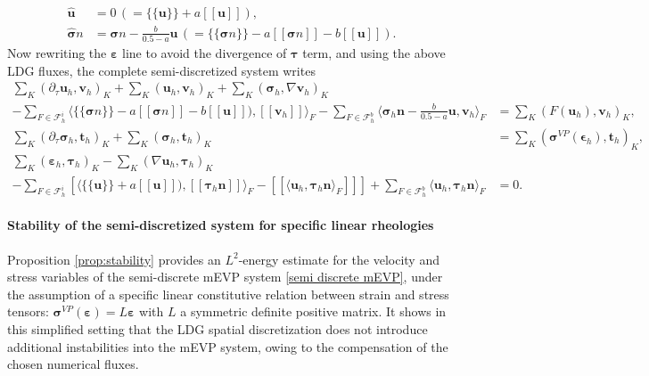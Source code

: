\documentclass[11pt]{article}
\newcommand{\bu}{\mathbf{u}}
\newcommand{\bt}{\mathbf{t}}
\newcommand{\sig}{\boldsymbol{\sigma}}
\newcommand{\btau}{\boldsymbol{\tau}}
\newcommand{\beps}{\boldsymbol{\varepsilon}}
\newcommand{\ljp}{ [\![ }
\newcommand{\rjp}{ ]\!] }
\begin{document}
\begin{align}
\widehat{\mathbf{u}} &= 0 \, (= \{\!\{\bu \}\!\} + a \ljp \bu\rjp), \\
\widehat{\sig} n
&= \sig n - \frac{b}{0.5-a} \bu \, (= 
\{\!\{\sig n\}\!\} - a \ljp \sig n \rjp
- b [\![\bu]\!]).
\end{align}
Now rewriting the $\beps$ line to avoid the divergence of $\btau$ term, and using the above LDG fluxes, the complete semi-discretized system writes
\begingroup
\small
\begin{subequations}
    \label{semi discrete mEVP}
\begin{align}
 \sum_{K} ( \partial_\tau \mathbf{u}_h, \mathbf{v}_h)_K+ \sum_{K} (\mathbf{u}_h, \mathbf{v}_h)_K
+ \sum_{K} (\boldsymbol{\sigma}_h, \nabla \mathbf{v}_h)_K\qquad &\nonumber \\
%
-\sum_{F \in \mathcal{F}_h^i} \langle \{\!\{\sig n\}\!\} - a \ljp \sig n \rjp
- b [\![\bu]\!]), \ljp \mathbf{v}_h  \rjp\rangle_{F} 
%
-\sum_{F \in \mathcal{F}_h^b} \langle \boldsymbol{\sigma}_h \mathbf{n} - \frac{b}{0.5-a} \bu , \mathbf{v}_h \rangle_{F}
&= \sum_{K} (F(\bu_h), \mathbf{v}_h)_K,
\label{u line sd}\\
%
 \sum_K (\partial_\tau \boldsymbol{\sigma}_h, \bt_h)_K
+
\sum_K (\boldsymbol{\sigma}_h, \bt_h)_K
&= \sum_K (\boldsymbol{\sigma}^{VP}(\mathbf{\epsilon}_h), \bt_h)_K, \label{sig line sd}\\
%
\sum_{K} (\beps_h, \boldsymbol{\tau}_h)_K - \sum_{K} (\nabla \mathbf{u}_h, \boldsymbol{\tau}_h)_K  
\qquad&\nonumber
\\
%
- \sum_{F \in \mathcal{F}_h^i}  \left[ \langle \{\!\{\bu \}\!\} + a \ljp \bu\rjp), \ljp \boldsymbol{\tau}_h \mathbf{n} \rjp \rangle_F - \ljp \langle \mathbf{u}_h, \boldsymbol{\tau}_h \mathbf{n} \rangle_F \rjp \right] + \sum_{F \in \mathcal{F}_h^b}   \langle \mathbf{u}_h, \boldsymbol{\tau}_h \mathbf{n} \rangle_F& =0. \label{eps line sd}
\end{align}
\end{subequations}
\endgroup



\paragraph{Stability of the semi-discretized system for specific linear rheologies}
Proposition \ref{prop:stability} provides an $L^2$-energy estimate for the velocity and stress variables of the semi-discrete mEVP system \eqref{semi discrete mEVP}, under the assumption of a specific linear constitutive relation between strain and stress tensors: $\sig^{VP}(\beps) = L\beps$ with $L$ a symmetric definite positive matrix. It shows in this simplified setting that the LDG spatial discretization does not introduce additional instabilities into the mEVP system, owing to the compensation of the chosen numerical fluxes.
\end{document}
